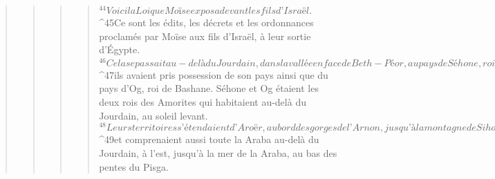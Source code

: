 \begin{verse}
\begin{verse}
\begin{verse}
\begin{verse}
${}^{44}Voici la Loi que Moïse exposa devant les fils d’Israël. 
${}^{45}Ce sont les édits, les décrets et les ordonnances proclamés par Moïse aux fils d’Israël, à leur sortie d’Égypte. 
${}^{46}Cela se passait au-delà du Jourdain, dans la vallée en face de Beth-Péor, au pays de Séhone, roi des Amorites, qui habitait à Heshbone. Moïse et les fils d’Israël l’avaient vaincu à leur sortie d’Égypte et 
${}^{47}ils avaient pris possession de son pays ainsi que du pays d’Og, roi de Bashane. Séhone et Og étaient les deux rois des Amorites qui habitaient au-delà du Jourdain, au soleil levant. 
${}^{48}Leurs territoires s’étendaient d’Aroër, au bord des gorges de l’Arnon, jusqu’à la montagne de Sihone, c’est-à-dire l’Hermon, 
${}^{49}et comprenaient aussi toute la Araba au-delà du Jourdain, à l’est, jusqu’à la mer de la Araba, au bas des pentes du Pisga.
      

\end{verse}
\end{verse}
\end{verse}
\end{verse}
